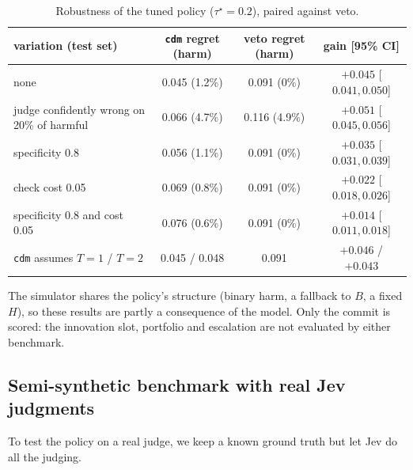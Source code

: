 \documentclass[11pt]{article}
\theoremstyle{definition}
\begin{document}
\begin{table}[h]
\centering\small
\setlength{\tabcolsep}{4pt}
\begin{tabular}{@{}lccc@{}}
\toprule
variation (test set) & \texttt{cdm} regret (harm) & veto regret (harm) & gain [95\% CI] \\
\midrule
none & 0.045 (1.2\%) & 0.091 (0\%) & $+0.045$ [$0.041,0.050$] \\
judge confidently wrong on 20\% of harmful & 0.066 (4.7\%) & 0.116 (4.9\%) & $+0.051$ [$0.045,0.056$] \\
specificity 0.8 & 0.056 (1.1\%) & 0.091 (0\%) & $+0.035$ [$0.031,0.039$] \\
check cost 0.05 & 0.069 (0.8\%) & 0.091 (0\%) & $+0.022$ [$0.018,0.026$] \\
specificity 0.8 and cost 0.05 & 0.076 (0.6\%) & 0.091 (0\%) & $+0.014$ [$0.011,0.018$] \\
\texttt{cdm} assumes $T=1$ / $T=2$ & 0.045 / 0.048 & 0.091 & $+0.046$ / $+0.043$ \\
\bottomrule
\end{tabular}
\caption{Robustness of the tuned policy ($\tau^\star=0.2$), paired against veto.}
\label{tab:robust}
\end{table}

The simulator shares the policy's structure (binary harm, a fallback to $B$, a fixed $H$), so these
results are partly a consequence of the model. Only the commit is scored: the innovation slot,
portfolio and escalation are not evaluated by either benchmark.

\subsection{Semi-synthetic benchmark with real Jev judgments}\label{sec:jev}

To test the policy on a real judge, we keep a known ground truth but let Jev do all the judging.
\end{document}
